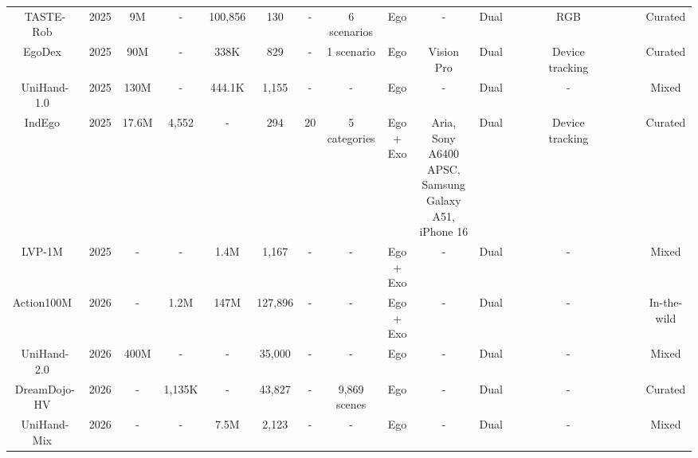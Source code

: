 \documentclass[Afour,sageh,times]{sagej}
\newcommand{\cmark}{\ding{51}}
\newcommand{\xmark}{\ding{55}}
\begin{document}
\begin{table}
\begin{tabular}{cccccccccccccccccccc}
TASTE-Rob~\citep{zhao2025taste} & 2025 & 9M & - & 100,856 & 130 & - & 6 scenarios & Ego & - & Dual & \xmark & \cmark & \cmark & RGB & \xmark & \xmark & \xmark & \cmark & Curated \\
EgoDex~\citep{hoque2025egodex} & 2025 & 90M & - & 338K & 829 & - & 1 scenario & Ego & Vision Pro & Dual & \xmark & \cmark & \cmark & Device tracking & \xmark & \xmark & \xmark & \cmark & Curated \\
UniHand-1.0~\citep{luo2025being} & 2025 & 130M & - & 444.1K & 1,155 & - & - & Ego & - & Dual & \xmark & \cmark & \cmark & - & \xmark & \xmark & \xmark & \cmark & Mixed \\
IndEgo~\citep{chavan2025indego} & 2025 & 17.6M & 4,552 & - & 294 & 20 & 5 categories & Ego + Exo & \makecell[c]{Aria, Sony A6400 APSC,\\ Samsung Galaxy A51,\\ iPhone 16} & Dual & \xmark & \cmark & \xmark & Device tracking & \xmark & \cmark & \cmark & \cmark & Curated \\
LVP-1M~\citep{chen2025large} & 2025 & - & - & 1.4M & 1,167 & - & - & Ego + Exo & - & Dual & \xmark & \xmark & \xmark & - & \xmark & \xmark & \xmark & \cmark & Mixed \\
Action100M~\citep{chen2026action100m} & 2026 & - & 1.2M & 147M & 127,896 & - & - & Ego + Exo & - & Dual & \xmark & \xmark & \xmark & - & \xmark & \xmark & \xmark & \cmark & In-the-wild \\
UniHand-2.0~\citep{luo2026being} & 2026 & 400M & - & - & 35,000 & - & - & Ego & - & Dual & \xmark & \cmark & \cmark & - & \xmark & \xmark & \xmark & \cmark & Mixed \\
DreamDojo-HV~\citep{gao2026dreamdojo} & 2026 & - & 1,135K & - & 43,827 & - & 9,869 scenes & Ego & - & Dual & \xmark & \cmark & \cmark & - & \xmark & \xmark & \xmark & \cmark & Curated \\
UniHand-Mix~\citep{luo2026joint} & 2026 & - & - & 7.5M & 2,123 & - & - & Ego & - & Dual & \xmark & \cmark & \cmark & - & \xmark & \xmark & \xmark & \cmark & Mixed \\
\bottomrule
\end{tabular}
\label{tab:human_video_datasets}
\end{table}
\clearpage
\end{document}
